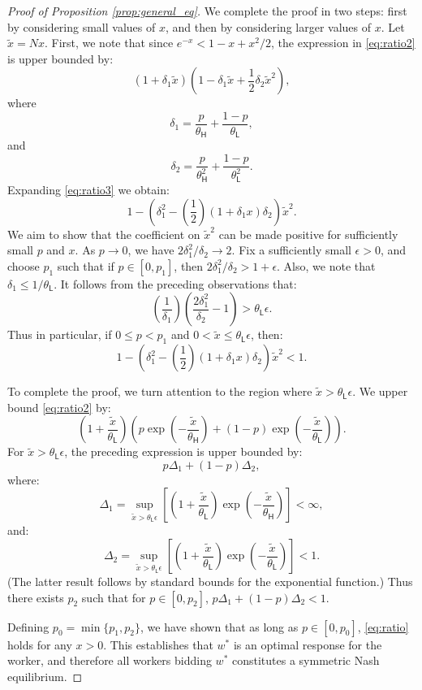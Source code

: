 \documentclass[11pt]{article}
\renewcommand{\H}{\ensuremath{\mathsf{H}}}
\renewcommand{\L}{\ensuremath{\mathsf{L}}}
\begin{document}
\begin{proof}[Proof of Proposition \ref{prop:general_eq}]
We complete the proof in two steps: first by considering small values of $x$, and then by considering larger values of $x$.
Let $\tilde{x} = Nx$.
First, we note that since $e^{-x} < 1 -x + x^2/2$, the expression in \eqref{eq:ratio2} is upper bounded by:
\begin{equation}
\label{eq:ratio3}
 (1 + \delta_1 \tilde{x})\left(1 - \delta_1 \tilde{x} + \frac{1}{2} \delta_2 \tilde{x}^2 \right),
\end{equation}
where
\[ \delta_1 = \frac{p}{\theta_{\H}} + \frac{1-p}{\theta_{\L}}, \]
and
\[ \delta_2 =  \frac{p}{\theta_\H^2} + \frac{1-p}{\theta_{\L}^2}. \]
Expanding \eqref{eq:ratio3} we obtain:
\[ 1 - \left(\delta_1^2 - \left(\frac{1}{2}\right) (1 + \delta_1 x) \delta_2\right)\tilde{x}^2. \]
We aim to show that the coefficient on $\tilde{x}^2$ can be made positive for sufficiently small $p$ and $x$.
As $p \to 0$, we have $2 \delta_1^2/\delta_2 \to 2$.
Fix a sufficiently small $\epsilon > 0$, and choose $p_1$ such that if $p \in [0,p_1]$, then $2\delta_1^2/\delta_2 > 1 + \epsilon$.
Also, we note that $\delta_1 \leq 1/\theta_\L$.  
It follows from the preceding observations that:
\[ \left(\frac{1}{\delta_1}\right) \left( \frac{2 \delta_1^2}{\delta_2} - 1\right) > \theta_\L\epsilon. \]
Thus in particular, if $0 \leq p < p_1$ and $0 < \tilde{x} \leq \theta_\L \epsilon$, then:
\[ 1 - \left(\delta_1^2 - \left(\frac{1}{2}\right) (1 + \delta_1 x) \delta_2\right)\tilde{x}^2 < 1. \]

To complete the proof, we turn attention to the region where $\tilde{x} > \theta_\L \epsilon$.
We upper bound \eqref{eq:ratio2} by:
\begin{equation}
\label{eq:ratio4}
 \left( 1 + \frac{\tilde{x}}{\theta_{\L}} \right)
\left( p \exp \left( -\frac{\tilde{x}}{\theta_{\H}} \right) + (1-p) \exp \left( -\frac{\tilde{x}}{\theta_{\L}} \right) \right).
\end{equation}
For $\tilde{x} > \theta_\L \epsilon$, the preceding expression is upper bounded by:
\begin{equation}
\label{eq:ratio5}
 p \Delta_1 + (1 - p)  \Delta_2,
\end{equation}
where:
\[ \Delta_1 = \sup_{\tilde{x} > \theta_\L \epsilon}  \left[ \left( 1 + \frac{\tilde{x}}{\theta_{\L}} \right)  \exp \left( -\frac{\tilde{x}}{\theta_{\H}} \right)\right] < \infty, \]
and:
\[ \Delta_2 = \sup_{\tilde{x} > \theta_\L \epsilon}  \left[ \left( 1 + \frac{\tilde{x}}{\theta_{\L}} \right)  \exp \left( -\frac{\tilde{x}}{\theta_{\L}} \right)\right] < 1. \]
(The latter result follows by standard bounds for the exponential function.)
Thus there exists $p_2$ such that for $p \in [0,p_2]$, $p \Delta_1 + (1-p)\Delta_2 < 1$.

Defining $p_0 = \min\{ p_1, p_2 \}$, we have shown that as long as $p \in [0,p_0]$, \eqref{eq:ratio} holds for any $x > 0$.
This establishes that $w^*$ is an optimal response for the worker, and therefore all workers bidding $w^*$ constitutes a symmetric Nash equilibrium.
\end{proof}
\end{document}
